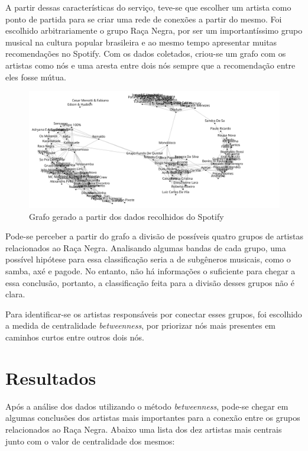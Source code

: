 \documentclass[12pt]{article}
\begin{document}
A partir dessas características do serviço, teve-se que escolher um artista como ponto de partida para se criar uma rede de conexões a partir do mesmo. Foi escolhido arbitrariamente o grupo Raça Negra, por ser um importantíssimo grupo musical na cultura popular brasileira e ao mesmo tempo apresentar muitas recomendações no Spotify. Com os dados coletados, criou-se um grafo com os artistas como nós e uma aresta entre dois nós sempre que a recomendação entre eles fosse mútua.

\begin{figure}[H]
	\centering
	\includegraphics[width=\textwidth]{grafo.png}
	\centering
	\caption{Grafo gerado a partir dos dados recolhidos do Spotify}\label{visina8}
\end{figure}

Pode-se perceber a partir do grafo a divisão de possíveis quatro grupos de artistas relacionados ao Raça Negra. Analisando algumas bandas de cada grupo, uma possível hipótese para essa classificação seria a de subgêneros musicais, como o samba, axé e pagode. No entanto, não há informações o suficiente para chegar a essa conclusão, portanto, a classificação feita para a divisão desses grupos não é clara.

Para identificar-se os artistas responsáveis por conectar esses grupos, foi escolhido a medida de centralidade \textit{betweenness}, por priorizar nós mais presentes em caminhos curtos entre outros dois nós.

\section{Resultados}
Após a análise dos dados utilizando o método  \textit{betweenness}, pode-se chegar em algumas conclusões dos artistas mais importantes para a conexão entre os grupos relacionados ao Raça Negra. Abaixo uma lista dos dez artistas mais centrais junto com o valor de centralidade dos mesmos:
\end{document}
